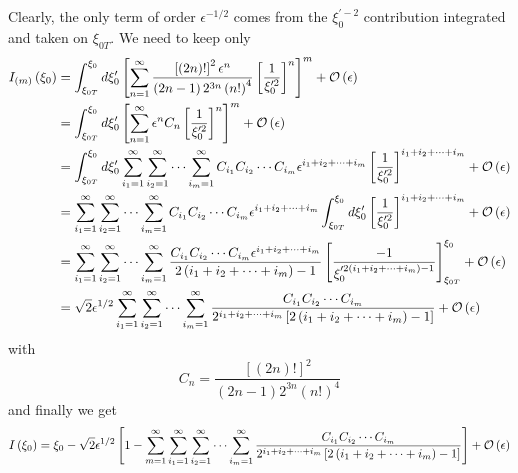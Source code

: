 Clearly, the only term of order $\epsilon^{-1/2}$ comes from the $\xi
_{0}^{\prime-2}$ contribution integrated and taken on $\xi_{0T}$. We need to
keep only
\begin{align*}
I_{\left( m\right) }\left( \xi_{0}\right) &
=\int_{\xi_{0T}}^{\xi_{0}}d\xi_{0}^{\prime}\left[ \sum_{n=1}^{\infty}\frac{%
\left[ \left( 2n\right) !\right] ^{2}\epsilon^{n}}{\left( 2n-1\right)
2^{3n}\left( n!\right) ^{4}}\left[ \frac{1}{\xi_{0}^{\prime2}}\right]
^{n}\right] ^{m}+\mathcal{O}\left( \epsilon\right) \\
& =\int_{\xi_{0T}}^{\xi_{0}}d\xi_{0}^{\prime}\left[ \sum_{n=1}^{\infty
}\epsilon^{n}C_{n}\left[ \frac{1}{\xi_{0}^{\prime2}}\right] ^{n}\right] ^{m}+%
\mathcal{O}\left( \epsilon\right) \\
&
=\int_{\xi_{0T}}^{\xi_{0}}d\xi_{0}^{\prime}\sum_{i_{1}=1}^{\infty}%
\sum_{i_{2}=1}^{\infty}\cdots\sum_{i_{m}=1}^{\infty}C_{i_{1}}C_{i_{2}}\cdots
C_{i_{m}}\epsilon^{i_{1}+i_{2}+\cdots+i_{m}}\left[ \frac{1}{\xi_{0}^{\prime
2}}\right] ^{i_{1}+i_{2}+\cdots+i_{m}}+\mathcal{O}\left( \epsilon\right) \\
&
=\sum_{i_{1}=1}^{\infty}\sum_{i_{2}=1}^{\infty}\cdots\sum_{i_{m}=1}^{%
\infty}C_{i_{1}}C_{i_{2}}\cdots
C_{i_{m}}\epsilon^{i_{1}+i_{2}+\cdots+i_{m}}\int_{\xi_{0T}}^{\xi_{0}}d%
\xi_{0}^{\prime}\left[ \frac{1}{\xi_{0}^{\prime2}}\right]
^{i_{1}+i_{2}+\cdots+i_{m}}+\mathcal{O}\left( \epsilon\right) \\
&
=\sum_{i_{1}=1}^{\infty}\sum_{i_{2}=1}^{\infty}\cdots\sum_{i_{m}=1}^{\infty}%
\frac{C_{i_{1}}C_{i_{2}}\cdots C_{i_{m}}\epsilon^{i_{1}+i_{2}+\cdots+i_{m}}}{%
2\left( i_{1}+i_{2}+\cdots+i_{m}\right) -1}\left[ \frac
{-1}{\xi_{0}^{\prime2\left( i_{1}+i_{2}+\cdots+i_{m}\right) -1}}\right]
_{\xi_{0T}}^{\xi_{0}}+\mathcal{O}\left( \epsilon\right) \\
& =\sqrt{2}\epsilon^{1/2}\sum_{i_{1}=1}^{\infty}\sum_{i_{2}=1}^{\infty}%
\cdots\sum_{i_{m}=1}^{\infty}\frac{C_{i_{1}}C_{i_{2}}\cdots C_{i_{m}}}{%
2^{i_{1}+i_{2}+\cdots+i_{m}}\left[ 2\left( i_{1}+i_{2}+\cdots +i_{m}\right)
-1\right] }+\mathcal{O}\left( \epsilon\right)
\end{align*}
with
\[
C_{n}=\frac{\left[ \left( 2n\right) !\right] ^{2}}{\left( 2n-1\right)
2^{3n}\left( n!\right) ^{4}}
\]
and finally we get
\[
I\left( \xi_{0}\right) =\xi_{0}-\sqrt{2}\epsilon^{1/2}\left[ 1-\sum
_{m=1}^{\infty}\sum_{i_{1}=1}^{\infty}\sum_{i_{2}=1}^{\infty}\cdots\sum
_{i_{m}=1}^{\infty}\frac{C_{i_{1}}C_{i_{2}}\cdots C_{i_{m}}}{%
2^{i_{1}+i_{2}+\cdots+i_{m}}\left[ 2\left( i_{1}+i_{2}+\cdots+i_{m}\right)
-1\right] }\right] +\mathcal{O}\left( \epsilon\right)
\]
